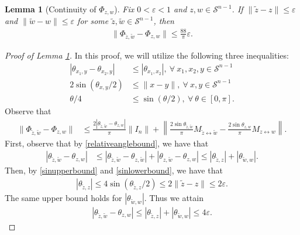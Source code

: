 \documentclass[11pt]{article}
\renewcommand{\epsilon}{\varepsilon}
\newtheorem{lem}{Lemma}
\theoremstyle{remark}
\begin{document}
\begin{lem}[Continuity of $\Phi_{z,w}$]\label{continuityphi}
Fix $0 < \epsilon < 1$ and $z,w \in \mathcal{S}^{n-1}$. If $\|\tilde{z} - z\| \leqslant \epsilon$ and $\|\tilde{w} - w\| \leqslant \epsilon$ for some $\tilde{z},\tilde{w} \in \mathcal{S}^{n-1}$, then \begin{align*}
\|\Phi_{\tilde{z},\tilde{w}} - \Phi_{z,w}\| \leqslant \frac{88}{\pi}\epsilon.
\end{align*}
\end{lem}
\begin{proof}[Proof of Lemma \ref{continuityphi}] In this proof, we will utilize the following three inequalities: \begin{align}
    |\theta_{x_1,y} - \theta_{x_2,y}| & \leqslant |\theta_{x_1,x_2}|,\ \forall\ x_1,x_2,y \in \mathcal{S}^{n-1} \label{relativeanglebound} \\
    2\sin(\theta_{x,y}/2) & \leqslant \|x - y\|,\ \forall\ x,y \in \mathcal{S}^{n-1} \label{sinupperbound} \\
    \theta/4 & \leqslant \sin(\theta/2),\ \forall\ \theta \in [0,\pi]. \label{sinlowerbound}
\end{align} Observe that \begin{align*}
    \|\Phi_{\tilde{z},\tilde{w}} - \Phi_{z,w}\| & \leqslant \frac{2|\theta_{\tilde{z},\tilde{w}} - \theta_{z,w}|}{\pi}\|I_n\| + \left\| \frac{2\sin \theta_{\tilde{z},\tilde{w}}}{\pi}M_{\tilde{z} \leftrightarrow \tilde{w}} - \frac{2\sin \theta_{z,w}}{\pi}M_{z \leftrightarrow w}\right\|.
\end{align*} First, observe that by \eqref{relativeanglebound}, we have that  \begin{align*}
    |\theta_{\tilde{z},\tilde{w}} - \theta_{z,w}| & \leqslant |\theta_{\tilde{z},\tilde{w}} - \theta_{z,\tilde{w}}| + |\theta_{z,\tilde{w}} - \theta_{z,w}| \leqslant |\theta_{\tilde{z},z}| + |\theta_{\tilde{w},w}|.
\end{align*} Then, by \eqref{sinupperbound} and \eqref{sinlowerbound}, we have that \begin{align*}
    |\theta_{\tilde{z},z}| \leqslant 4\sin(\theta_{\tilde{z},z}/2) \leqslant 2\|\tilde{z} - z\| \leqslant 2\epsilon.
\end{align*} The same upper bound holds for $|\theta_{\tilde{w},w}|$. Thus we attain \begin{align}
    |\theta_{\tilde{z},\tilde{w}} - \theta_{z,w}| \leqslant |\theta_{\tilde{z},z}| + |\theta_{\tilde{w},w}| \leqslant 4\epsilon. \label{thetabound}
\end{align} 


\end{proof}
\end{document}
